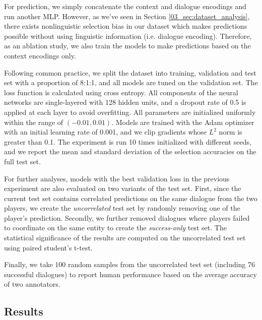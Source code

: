 For prediction, we simply concatenate the context and dialogue encodings and run another MLP. However, as we've seen in Section \ref{03_sec:dataset_analysis}, there exists nonlinguistic selection bias in our dataset which makes predictions possible without using linguistic information (i.e. dialogue encoding). Therefore, as an ablation study, we also train the models to make predictions based on the context encodings only.

Following common practice, we split the dataset into training, validation and test set with a proportion of 8:1:1, and all models are tuned on the validation set. The loss function is calculated using cross entropy. All components of the neural networks are single-layered with 128 hidden units, and a dropout rate of 0.5 is applied at each layer to avoid overfitting. All parameters are initialized uniformly within the range of $(-0.01, 0.01)$. Models are trained with the Adam optimizer \citep{Kingma2015AdamAM} with an initial learning rate of 0.001, and we clip gradients whose $L^2$ norm is greater than 0.1. The experiment is run 10 times initialized with different seeds, and we report the mean and standard deviation of the selection accuracies on the full test set.

For further analyses, models with the best validation loss in the previous experiment are also evaluated on two variants of the test set. First, since the current test set contains correlated predictions on the same dialogue from the two players, we create the \textit{uncorrelated} test set by randomly removing one of the player's prediction. Secondly, we further removed dialogues where players failed to coordinate on the same entity to create the \textit{success-only} test set. The statistical significance of the results are computed on the uncorrelated test set using paired student's t-test.

Finally, we take 100 random samples from the uncorrelated test set (including 76 successful dialogues) to report human performance based on the average accuracy of two annotators.

\subsection{Results}
\label{03_subsec:results}

